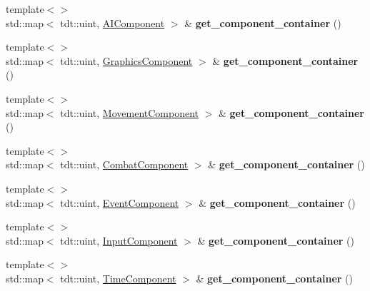 \begin{DoxyCompactItemize}
\item 
{\footnotesize template$<$$>$ }\\std\+::map$<$ tdt\+::uint, \hyperlink{struct_a_i_component}{A\+I\+Component} $>$ \& {\bfseries get\+\_\+component\+\_\+container} ()\hypertarget{class_entity_system_a961905fcd206dc5569a676e880841ca2}{}\label{class_entity_system_a961905fcd206dc5569a676e880841ca2}

\item 
{\footnotesize template$<$$>$ }\\std\+::map$<$ tdt\+::uint, \hyperlink{struct_graphics_component}{Graphics\+Component} $>$ \& {\bfseries get\+\_\+component\+\_\+container} ()\hypertarget{class_entity_system_a9909afda5535746578bccefe53aa5c34}{}\label{class_entity_system_a9909afda5535746578bccefe53aa5c34}

\item 
{\footnotesize template$<$$>$ }\\std\+::map$<$ tdt\+::uint, \hyperlink{struct_movement_component}{Movement\+Component} $>$ \& {\bfseries get\+\_\+component\+\_\+container} ()\hypertarget{class_entity_system_af5f2dbc119c055782ebd1106660008c3}{}\label{class_entity_system_af5f2dbc119c055782ebd1106660008c3}

\item 
{\footnotesize template$<$$>$ }\\std\+::map$<$ tdt\+::uint, \hyperlink{struct_combat_component}{Combat\+Component} $>$ \& {\bfseries get\+\_\+component\+\_\+container} ()\hypertarget{class_entity_system_a539a0d84d6a529fedc3907bd27a5c6d0}{}\label{class_entity_system_a539a0d84d6a529fedc3907bd27a5c6d0}

\item 
{\footnotesize template$<$$>$ }\\std\+::map$<$ tdt\+::uint, \hyperlink{struct_event_component}{Event\+Component} $>$ \& {\bfseries get\+\_\+component\+\_\+container} ()\hypertarget{class_entity_system_a1bf83e12fffdab7688d5ee22dda797e6}{}\label{class_entity_system_a1bf83e12fffdab7688d5ee22dda797e6}

\item 
{\footnotesize template$<$$>$ }\\std\+::map$<$ tdt\+::uint, \hyperlink{struct_input_component}{Input\+Component} $>$ \& {\bfseries get\+\_\+component\+\_\+container} ()\hypertarget{class_entity_system_af4df13ed73cc7bf18a4882c5ab6dcdcc}{}\label{class_entity_system_af4df13ed73cc7bf18a4882c5ab6dcdcc}

\item 
{\footnotesize template$<$$>$ }\\std\+::map$<$ tdt\+::uint, \hyperlink{struct_time_component}{Time\+Component} $>$ \& {\bfseries get\+\_\+component\+\_\+container} ()\hypertarget{class_entity_system_aeada2412672fbea2b7a914e2d3b30a2d}{}\label{class_entity_system_aeada2412672fbea2b7a914e2d3b30a2d}


\end{DoxyCompactItemize}
